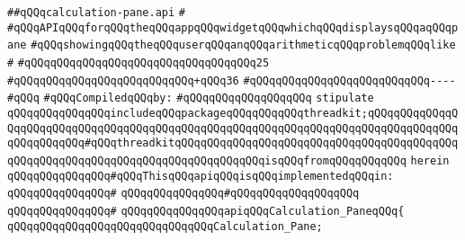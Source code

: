 \label{src/lib/x-kit/tut/arithmetic-game/calculation-pane.api}
\verb|##qQQqcalculation-pane.api|\newline
\verb|#|\newline
\verb|#qQQqAPIqQQqforqQQqtheqQQqappqQQqwidgetqQQqwhichqQQqdisplaysqQQqaqQQqpane|\newline
\verb|#qQQqshowingqQQqtheqQQquserqQQqanqQQqarithmeticqQQqproblemqQQqlike|\newline
\verb|#|\newline
\verb|#qQQqqQQqqQQqqQQqqQQqqQQqqQQqqQQqqQQq25|\newline
\verb|#qQQqqQQqqQQqqQQqqQQqqQQqqQQq+qQQq36|\newline
\verb|#qQQqqQQqqQQqqQQqqQQqqQQqqQQq----|\newline
\verb|#qQQq|\newline
\newline
\verb|#qQQqCompiledqQQqby:|\newline
\verb|#qQQqqQQqqQQqqQQqqQQq|\newline
\newline
\newline
\verb|stipulate|\newline
\verb|qQQqqQQqqQQqqQQqincludeqQQqpackageqQQqqQQqqQQqthreadkit;qQQqqQQqqQQqqQQqqQQqqQQqqQQqqQQqqQQqqQQqqQQqqQQqqQQqqQQqqQQqqQQqqQQqqQQqqQQqqQQqqQQqqQQqqQQqqQQq#qQQqthreadkitqQQqqQQqqQQqqQQqqQQqqQQqqQQqqQQqqQQqqQQqqQQqqQQqqQQqqQQqqQQqqQQqqQQqqQQqqQQqqQQqqQQqisqQQqfromqQQqqQQqqQQq|\newline
\verb|herein|\newline
\newline
\verb|qQQqqQQqqQQqqQQq#qQQqThisqQQqapiqQQqisqQQqimplementedqQQqin:|\newline
\verb|qQQqqQQqqQQqqQQq#|\newline
\verb|qQQqqQQqqQQqqQQq#qQQqqQQqqQQqqQQqqQQq|\newline
\verb|qQQqqQQqqQQqqQQq#|\newline
\verb|qQQqqQQqqQQqqQQqapiqQQqCalculation_PaneqQQq{|\newline
\newline
\verb|qQQqqQQqqQQqqQQqqQQqqQQqqQQqqQQqCalculation_Pane;|\newline
